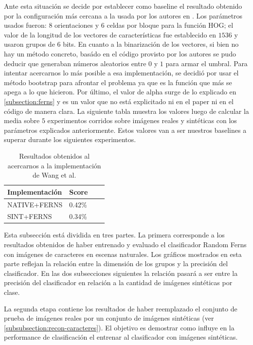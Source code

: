 	Ante esta situación se decide por establecer como baseline el resultado obtenido por la configuración más cercana a la usada por los autores en \cite{wang}. Los parámetros usados fueron: $8$ orientaciones y $6$ celdas por bloque para la función HOG; el valor de la longitud de los vectores de características fue establecido en $1536$ y usaron grupos de $6$ bits. En cuanto a la binarización de los vectores, si bien no hay un método concreto, basádo en el código provisto por los autores se pudo deducir que generaban números aleatorios entre $0$ y $1$ para armar el umbral. Para intentar acercarnos lo más posible a esa implementación, se decidió por usar el método bootstrap para afrontar el problema ya que es la función que más se apega a lo que hicieron. Por último, el valor de alpha surge de lo explicado en \ref{subsection:ferns} y es un valor que no está explicitado ni en el paper ni en el código de manera clara. La siguiente tabla muestra los valores luego de calcular la media sobre $5$ experimentos corridos sobre imágenes reales y sintéticas con los parámetros explicados anteriormente. Estos valores van a ser nuestros baselines a superar durante los siguientes experimentos.
	
	\begin{table}
		\centering
	    \begin{tabular}{ | l | l | l | p{5cm} |}
    			\hline
    				\textbf{Implementación} & \textbf{Score} \\ \hline
    				NATIVE+FERNS & 0.42\% \\ \hline
    				SINT+FERNS & 0.34\% \\
    			\hline
    		\end{tabular}	
    		\caption[Resultados reales y sintéticas para baseline]{Resultados obtenidos al acercarnos a la implementación de Wang et al.}
    		\label{table: Baseline}
	\end{table}
	 
	Esta subsección está dividida en tres partes. La primera corresponde a los resultados obtenidos de haber entrenado y evaluado el clasificador Random Ferns con imágenes de caracteres en escenas naturales. Los gráficos mostrados en esta parte reflejan la relación entre la dimensión de los grupos y la precisión del clasificador. En las dos subsecciones siguientes la relación pasará a ser entre la precisión del clasificador en relación a la cantidad de imágenes sintéticas por clase.
	
	La segunda etapa contiene los resultados de haber reemplazado el conjunto de prueba de imágenes reales por un conjunto de imágenes sintéticas (ver \ref{subsubsection:recon-caracteres}). El objetivo es demostrar como influye en la performance de clasificación el entrenar al clasificador con imágenes sintéticas.
	
